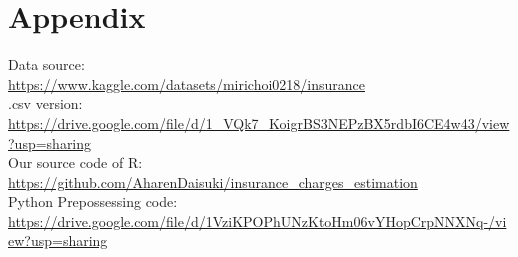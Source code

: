 \documentclass[12pt,a4paper]{article}
\begin{document}
\section{Appendix}
Data source: \\
\url{https://www.kaggle.com/datasets/mirichoi0218/insurance}\\
.csv version: \\
 \url{https://drive.google.com/file/d/1_VQk7_KoigrBS3NEPzBX5rdbI6CE4w43/view?usp=sharing}\\
Our source code of R:\\ \url{https://github.com/AharenDaisuki/insurance_charges_estimation} \\
Python Prepossessing code: \\
 \url{https://drive.google.com/file/d/1VziKPOPhUNzKtoHm06vYHopCrpNNXNq-/view?usp=sharing}
\end{document}
